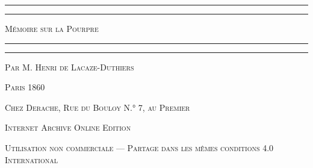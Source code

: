 \documentclass[a4paper, 11pt, oneside, polutonikogreek, french]{article}
\begin{document}
\renewcommand{\thefigure}{{\bfseries\arabic{figure}}}
\renewcommand\thefootnote{\tiny{\arabic{footnote}}}
\let\oldfootnote\footnote
    \renewcommand{\footnote}[1]{\oldfootnote{\bfseries\footnotesize#1}}
    
\bfseries
\pagestyle{plain} %

\begin{titlepage} %
	\centering %

	
	\rule{\textwidth}{1.6pt}\vspace*{-\baselineskip}\vspace*{2pt} %
	\rule{\textwidth}{0.4pt} %
	
	\vspace{1\baselineskip} %
	
	{\scshape\Huge Mémoire sur la Pourpre}
	
	\vspace{1\baselineskip} %

	\rule{\textwidth}{0.4pt}\vspace*{-\baselineskip}\vspace{3.2pt} %
	\rule{\textwidth}{1.6pt} %
	
	\vspace{1\baselineskip} %
	
	
	{\scshape Par \Large M. Henri de Lacaze-Duthiers} %
	
	\vspace*{1\baselineskip} %
    
        \vspace*{\fill}

	\vspace{1\baselineskip}

	{\small\scshape Paris 1860}
	
	{\small\scshape{Chez Derache, Rue du Bouloy N.° 7, au Premier}}
	
	\vspace{0.5\baselineskip} %

        \scshape Internet Archive Online Edition  %
	
	{\scshape\small Utilisation non commerciale --- Partage dans les mêmes conditions 4.0 International} %
\end{titlepage}
\setlength{\parskip}{1mm plus1mm minus1mm}
\clearpage
\large\bfseries
\tableofcontents
\clearpage
\end{document}
